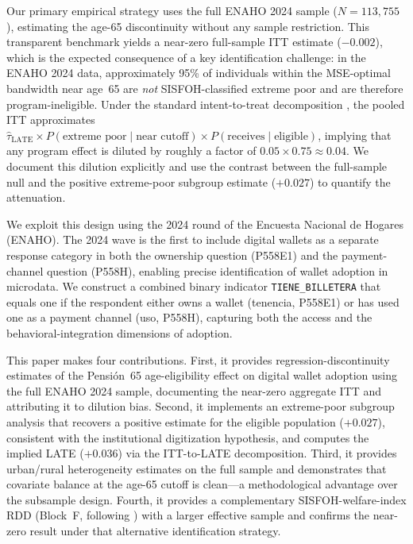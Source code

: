 \documentclass[12pt]{article}
\begin{document}
Our primary empirical strategy uses the full ENAHO 2024 sample
($N=113{,}755$), estimating the age-65 discontinuity without any sample
restriction. This transparent benchmark yields a near-zero full-sample ITT
estimate ($-0.002$), which is the expected consequence of a key
identification challenge: in the ENAHO 2024 data, approximately 95\% of
individuals within the MSE-optimal bandwidth near age~65 are \emph{not}
SISFOH-classified extreme poor and are therefore program-ineligible. Under
the standard intent-to-treat decomposition \citep{angrist2009}, the pooled
ITT approximates
$\hat{\tau}_{\text{LATE}} \times P(\text{extreme poor} \mid \text{near cutoff}) \times P(\text{receives} \mid \text{eligible})$,
implying that any program effect is diluted by roughly a factor of
$0.05 \times 0.75 \approx 0.04$. We document this dilution explicitly and
use the contrast between the full-sample null and the positive extreme-poor
subgroup estimate ($+0.027$) to quantify the attenuation.

We exploit this design using the 2024 round of the Encuesta Nacional de
Hogares (ENAHO). The 2024 wave is the first to include digital wallets as a
separate response category in both the ownership question (P558E1) and the
payment-channel question (P558H), enabling precise identification of wallet
adoption in microdata. We construct a combined binary indicator
\texttt{TIENE\_BILLETERA} that equals one if the respondent either owns a
wallet (tenencia, P558E1) or has used one as a payment channel (uso, P558H),
capturing both the access and the behavioral-integration dimensions of
adoption.

This paper makes four contributions. First, it provides regression-discontinuity
estimates of the Pensi\'on~65 age-eligibility effect on digital wallet
adoption using the full ENAHO 2024 sample, documenting the near-zero
aggregate ITT and attributing it to dilution bias. Second, it implements an
extreme-poor subgroup analysis that recovers a positive estimate for the
eligible population ($+0.027$), consistent with the institutional
digitization hypothesis, and computes the implied LATE ($+0.036$) via the
ITT-to-LATE decomposition. Third, it provides urban/rural heterogeneity
estimates on the full sample and demonstrates that covariate balance at the
age-65 cutoff is clean---a methodological advantage over the subsample
design. Fourth, it provides a complementary SISFOH-welfare-index RDD
(Block~F, following \citealt{bando2020}) with a larger effective sample
and confirms the near-zero result under that alternative identification
strategy.
\end{document}

